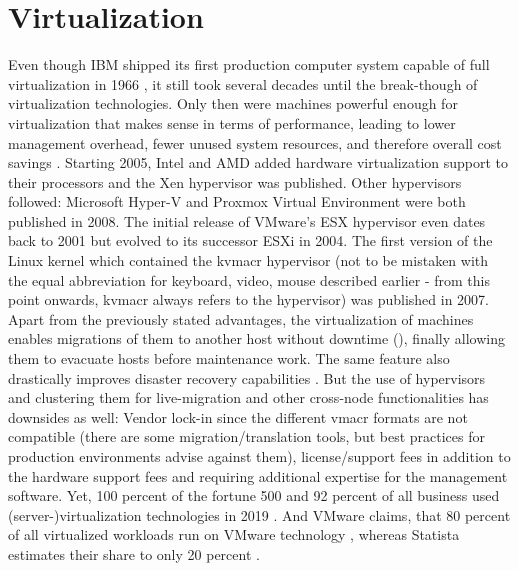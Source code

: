 \section{Virtualization}
Even though IBM shipped its first production computer system capable of full virtualization in 1966 \cite{ibm_first_hypervisor}, it still took several decades until the  break-though of virtualization technologies. Only then were machines powerful enough for virtualization that makes sense in terms of performance, leading to lower management overhead, fewer unused system resources, and therefore overall cost savings \cite{xen_killer}.
Starting 2005, Intel and AMD added hardware virtualization support to their processors and the Xen hypervisor was published. Other hypervisors followed: Microsoft Hyper-V and Proxmox Virtual Environment were both published in 2008. The initial release of VMware's ESX hypervisor even dates back to 2001 but evolved to its successor ESXi in 2004. The first version of the Linux kernel which contained the \gls{kvmacr} hypervisor (not to be mistaken with the equal abbreviation for keyboard, video, mouse described earlier - from this point onwards, \gls{kvmacr} always refers to the hypervisor) was published in 2007.
\newline
Apart from the previously stated advantages, the virtualization of machines enables migrations of them to another host without downtime (), finally allowing them to evacuate hosts before maintenance work. The same feature also drastically improves disaster recovery capabilities \cite{definition_server_virtualization}.
\newline
But the use of hypervisors and clustering them for live-migration and other cross-node functionalities has downsides as well: Vendor lock-in since the different \gls{vmacr} formats are not compatible (there are some migration/translation tools, but best practices for production environments advise against them), license/support fees in addition to the hardware support fees and requiring additional expertise for the management software.
\newline
Yet, 100 percent of the fortune 500 and 92 percent of all business used (server-)virtualization technologies in 2019 \cite{adoption_of_virtualization_technologies} \cite{vmware_accelerate_it} \cite{spiceworks_state_of_virtualization}. And VMware claims, that 80 percent of all virtualized workloads run on VMware technology \cite{vmware_accelerate_it}, whereas Statista estimates their share to only 20 percent \cite{statista_vmware}.

